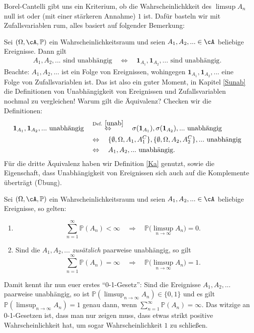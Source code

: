 Borel-Cantelli gibt uns ein Kriterium, ob die Wahrscheinlichkkeit des $\limsup A_n$ null ist oder (mit einer st\"arkeren Annahme) $1$ ist. Daf\"ur basteln wir mit Zufallsvariablen rum, alles basiert auf folgender Bemerkung:
\begin{bem}\label{ereig}
	Sei $(\Omega, \cA, \mathbb{P})$ ein Wahrscheinlichkeitsraum und seien $A_1,A_2,... \in \cA$ beliebige Ereignisse. Dann gilt
	\begin{align*}
		A_1, A_2, ... \text{ sind unabh\"angig}\quad \Leftrightarrow\quad  \mathbf{1}_{A_1},\mathbf{1}_{A_2},... \text{ sind unabhängig}.
	\end{align*}
	Beachte: $A_1, A_2, ...$ ist ein Folge von Ereignissen, wohingegen $\mathbf{1}_{A_1},\mathbf{1}_{A_2},... $ eine Folge von Zufallsvariablen ist. Das ist also ein guter Moment, in Kapitel \ref{Sunab} die Definitionen von Unabh\"angigkeit von Ereignissen und Zufallsvariablen nochmal zu vergleichen! Warum gilt die \"Aquivalenz? Checken wir die Definitionen:
	\begin{align*}
		\mathbf{1}_{A_1},\mathbf{1}_{A_2},... \text{ unabh\"angig}\quad 
		&\overset{\text{Def. }\ref{unab}}{\Leftrightarrow} \quad \sigma(\mathbf{1}_{A_1}),\sigma(\mathbf{1}_{A_2}),... \text{ unabhängig}\\
		&\Leftrightarrow\quad \{ \emptyset, \Omega, A_1, A_1^C \},\{ \emptyset, \Omega, A_2, A_2^C \}, ... \text{ unabhängig}\\
		&\Leftrightarrow\quad A_1, A_2, ... \text{ unabh\"angig}.
	\end{align*}
F\"ur die dritte \"Aquivalenz haben wir Definition \ref{Ka} genutzt, sowie die Eigenschaft, dass Unabh\"angigkeit von Ereignissen sich auch auf die Komplemente \"ubertr\"agt (\"Ubung). 
	
	
\end{bem}

\begin{satz}\label{BC}
	Sei $(\Omega, \cA, \mathbb{P})$ ein Wahrscheinlichkeitsraum und seien $A_1,A_2,... \in \cA$ beliebige Ereignisse, so gelten:
	\begin{enumerate}[label=(\roman*)]
		\item \[ \sum\limits_{n = 1}^{\infty} \mathbb{P}(A_n) < \infty \quad \Rightarrow\quad  \mathbb{P}\big(\limsup\limits_{n \to \infty} A_n\big) =0. \]
		\item Sind die $A_1, A_2, ...$ \textit{zusätzlich} paarweise unabhängig, so gilt \[ \sum\limits_{n = 1}^{\infty} \mathbb{P}(A_n) = \infty \quad \Rightarrow \quad \mathbb{P}\big(\limsup\limits_{n \to \infty} A_n\big) = 1. \]
	\end{enumerate}
\end{satz}
	Damit kennt ihr nun euer erstes \enquote{0-1-Gesetz}: Sind die Ereignisse $A_1, A_2, ...$ paarweise unabh\"angig, so ist $\mathbb P(\limsup_{n\to\infty} A_n)\in \{0,1\}$ und es gilt $\mathbb P(\limsup_{n\to\infty}A_n)=1$ genau dann, wenn $\sum_{n=1}^\infty \mathbb P(A_n)=\infty$. Das witzige an 0-1-Gesetzen ist, dass man nur zeigen muss, dass etwas strikt positive Wahrscheinlichkeit hat, um sogar Wahrscheinlichkeit $1$ zu schlie\ss en. 

